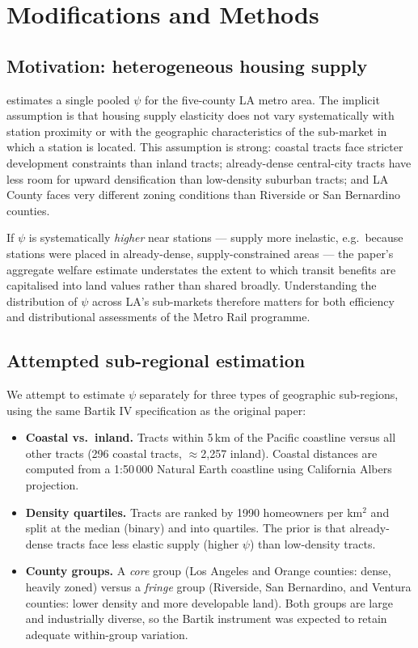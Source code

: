 \documentclass[12pt,a4paper]{article}
\begin{document}
\section{Modifications and Methods}
\label{sec:methods}

\subsection{Motivation: heterogeneous housing supply}

\citet{severen2021} estimates a single pooled $\psi$ for the five-county LA metro
area.  The implicit assumption is that housing supply elasticity does not vary
systematically with station proximity or with the geographic characteristics of
the sub-market in which a station is located.  This assumption is strong:
coastal tracts face stricter development constraints than inland tracts;
already-dense central-city tracts have less room for upward densification than
low-density suburban tracts; and LA County faces very different zoning conditions
than Riverside or San Bernardino counties.

If $\psi$ is systematically \emph{higher} near stations --- supply more
inelastic, e.g.\ because stations were placed in already-dense,
supply-constrained areas --- the paper's aggregate welfare estimate understates
the extent to which transit benefits are capitalised into land values rather
than shared broadly.  Understanding the distribution of $\psi$ across LA's
sub-markets therefore matters for both efficiency and distributional
assessments of the Metro Rail programme.

\subsection{Attempted sub-regional estimation}
\label{subsec:subreg}

We attempt to estimate $\psi$ separately for three types of geographic
sub-regions, using the same Bartik IV specification as the original paper:

\begin{itemize}[leftmargin=1.5em, itemsep=2pt]
  \item \textbf{Coastal vs.\ inland.}  Tracts within 5\,km of the Pacific
    coastline versus all other tracts (296 coastal tracts,
    $\approx$2,257 inland).  Coastal distances are computed from a
    1:50\,000 Natural Earth coastline using California Albers projection.
  \item \textbf{Density quartiles.}  Tracts are ranked by 1990 homeowners
    per km$^2$ and split at the median (binary) and into quartiles.
    The prior is that already-dense tracts face less elastic supply
    (higher $\psi$) than low-density tracts.
  \item \textbf{County groups.}  A \emph{core} group (Los Angeles and Orange
    counties: dense, heavily zoned) versus a \emph{fringe} group (Riverside,
    San Bernardino, and Ventura counties: lower density and more
    developable land).  Both groups are large and industrially diverse,
    so the Bartik instrument was expected to retain adequate within-group
    variation.
\end{itemize}
\end{document}
